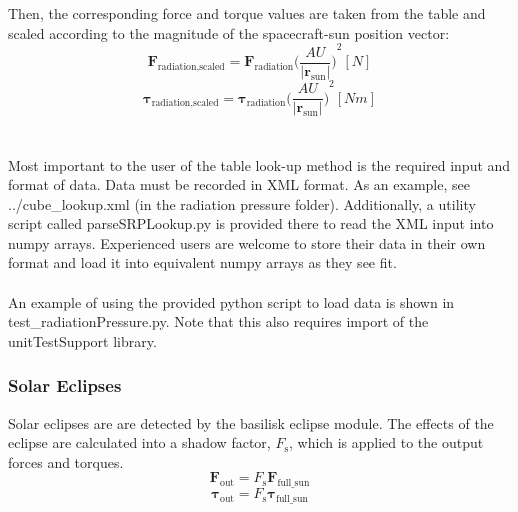 Then, the corresponding force and torque values are taken from the table and scaled according to the magnitude of the spacecraft-sun position vector:
\begin{equation}
{\mathbf{F}_{\textrm{radiation,scaled}}} = {\mathbf{F}_{\textrm{radiation}}}{\Big(  \frac{AU}{|\textbf{r}_{\textrm{sun}}|}  \Big)}^{2} [N]
\end{equation}
\begin{equation}
{\bm{\tau}_{\textrm{radiation,scaled}}} = {\bm{\tau}_{\textrm{radiation}}}{\Big(  \frac{AU}{|\textbf{r}_{\textrm{sun}}|}  \Big)}^{2} [Nm]
\end{equation}\\\\
Most important to the user of the table look-up method is the required input and format of data. Data must be recorded in XML format. As an example, see ../cube\_lookup.xml (in the radiation pressure folder). Additionally, a utility script called parseSRPLookup.py is provided there to read the XML input into numpy arrays. Experienced users are welcome to store their data in their own format and load it into equivalent numpy arrays as they see fit.\\\\
An example of using the provided python script to load data is shown in test\_radiationPressure.py. Note that this also requires import of the unitTestSupport library.\\
\subsubsection{Solar Eclipses}
Solar eclipses are are detected by the basilisk eclipse module. The effects of the eclipse are calculated into a shadow factor, $F_{\mathrm{s}}$, which is applied to the output forces and torques. 
\begin{equation}
\mathbf{F}_{\mathrm{out}} = F_{\mathrm{s}}\mathbf{F}_{\mathrm{full\_sun}}
\end{equation}
\begin{equation}
\bm{\tau}_{\mathrm{out}} = F_{\mathrm{s}}\bm{\tau}_{\mathrm{full\_sun}}
\end{equation}